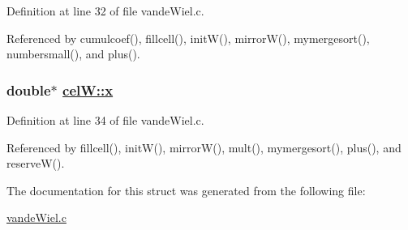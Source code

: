 Definition at line 32 of file vande\-Wiel.c.

Referenced by cumulcoef(), fillcell(), init\-W(), mirror\-W(), mymergesort(), numbersmall(), and plus().\hypertarget{structcelW_o2}{
\subsubsection[x]{\setlength{\rightskip}{0pt plus 5cm}double$\ast$ \hyperlink{structcelW_o2}{cel\-W::x}}}
\label{structcelW_o2}




Definition at line 34 of file vande\-Wiel.c.

Referenced by fillcell(), init\-W(), mirror\-W(), mult(), mymergesort(), plus(), and reserve\-W().

The documentation for this struct was generated from the following file:\begin{CompactItemize}
\item 
\hyperlink{vandeWiel_8c}{vande\-Wiel.c}\end{CompactItemize}
